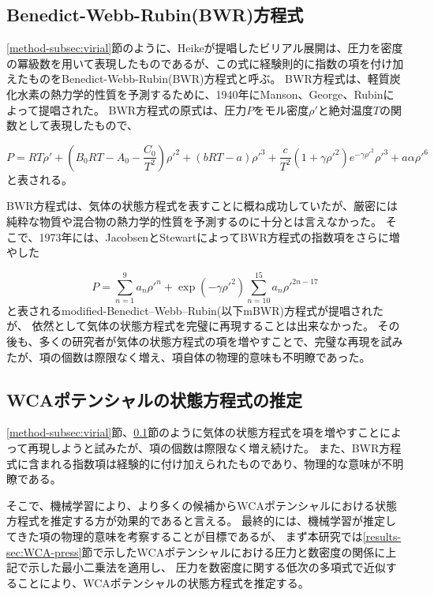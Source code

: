 \documentclass[titlepage]{jsreport}
\begin{document}
{{{\subsection{Benedict-Webb-Rubin(BWR)方程式}\label{method-subsec:BWR}
\ref{method-subsec:virial}節のように、Heikeが提唱したビリアル展開は、圧力を密度の冪級数を用いて表現したものであるが、この式に経験則的に指数の項を付け加えたものをBenedict-Webb-Rubin(BWR)方程式と呼ぶ。
BWR方程式は、軽質炭化水素の熱力学的性質を予測するために、1940年にManson、George、Rubinによって提唱された\cite{BWR-equation:original}。
BWR方程式の原式は、圧力$P$をモル密度${\rho}'$と絶対温度$T$の関数として表現したもので、

\large
\begin{equation}
P=RT{\rho}'+\left(B_0RT-A_0-{\frac{C_0}{T^2}}\right){{\rho}'}^2+(bRT-a){{\rho}'}^3+{\frac{c}{T^2}}(1+{\gamma}{{\rho}'}^2)e^{-{\gamma}{{\rho}'}^2}{{\rho}'}^3+a{\alpha}{{\rho}'}^6\label{eq:BWR}
\end{equation}
\normalsize
と表される。

BWR方程式は、気体の状態方程式を表すことに概ね成功していたが、厳密には純粋な物質や混合物の熱力学的性質を予測するのに十分とは言えなかった。
そこで、1973年には、JacobsenとStewartによってBWR方程式の指数項をさらに増やした

\large
\begin{equation}
P=\sum_{n=1}^9a_n{{\rho}'}^n+\exp(-{\gamma}{{\rho}'}^2)\sum_{n=10}^{15}a_n{{\rho}'}^{2n-17}\label{eq:mBWR}
\end{equation}
\normalsize
と表されるmodified-Benedict–Webb–Rubin(以下mBWR)方程式が提唱\cite{m-BWR-equation}されたが、
依然として気体の状態方程式を完璧に再現することは出来なかった。
その後も、多くの研究者が気体の状態方程式の項を増やすことで、完璧な再現を試みた\cite{MCCARTY1974276,BWR-equation:13,BWR-equation:25}が、項の個数は際限なく増え、項自体の物理的意味も不明瞭であった。

\subsection{WCAポテンシャルの状態方程式の推定}\label{method-subsec:WCA-equation}
\ref{method-subsec:virial}節、\ref{method-subsec:BWR}節のように気体の状態方程式を項を増やすことによって再現しようと試みたが、項の個数は際限なく増え続けた。
また、BWR方程式に含まれる指数項は経験的に付け加えられたものであり、物理的な意味が不明瞭である。

そこで、機械学習により、より多くの候補からWCAポテンシャルにおける状態方程式を推定する方が効果的であると言える。
最終的には、機械学習が推定してきた項の物理的意味を考察することが目標であるが、
まず本研究では\ref{results-sec:WCA-press}節で示したWCAポテンシャルにおける圧力と数密度の関係に上記で示した最小二乗法を適用し、
圧力を数密度に関する低次の多項式で近似することにより、WCAポテンシャルの状態方程式を推定する。

}}}
\end{document}
